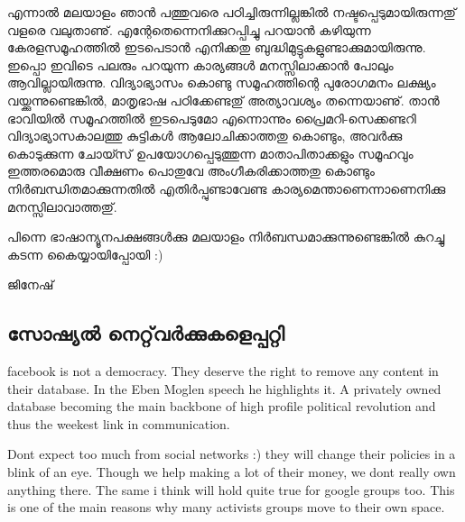 എന്നാല്‍ മലയാളം ഞാന്‍ പത്തുവരെ പഠിച്ചിരുന്നില്ലങ്കില്‍
നഷ്ടപ്പെടുമായിരുന്നതു് വളരെ വലുതാണു്. എന്റേതെന്നെനിക്കുറപ്പിച്ചു
പറയാന്‍ കഴിയുന്ന കേരളസമൂഹത്തില്‍ ഇടപെടാന്‍ എനിക്കതു
ബുദ്ധിമുട്ടുകളുണ്ടാക്കുമായിരുന്നു. ഇപ്പൊ ഇവിടെ പലരും പറയുന്ന
കാര്യങ്ങള്‍ മനസ്സിലാക്കാന്‍ പോലും ആവില്ലായിരുന്നു. വിദ്യാഭ്യാസം കൊണ്ടു
സമൂഹത്തിന്റെ പുരോഗമനം ലക്ഷ്യം വയ്ക്കുന്നുണ്ടെങ്കില്‍, മാതൃഭാഷ
പഠിക്കേണ്ടതു് അത്യാവശ്യം തന്നെയാണു്. താന്‍ ഭാവിയില്‍ സമൂഹത്തില്‍
ഇടപെടുമോ എന്നൊന്നും പ്രൈമറി-സെക്കണ്ടറി വിദ്യാഭ്യാസകാലത്തു കുട്ടികള്‍
ആലോചിക്കാത്തതു കൊണ്ടും, അവര്‍ക്കു കൊടുക്കുന്ന ചോയ്സ്
ഉപയോഗപ്പെടുത്തുന്ന മാതാപിതാക്കളും സമൂഹവും ഇത്തരമൊരു വീക്ഷണം പൊതുവേ
അംഗീകരിക്കാത്തതു കൊണ്ടും നിര്‍ബന്ധിതമാക്കുന്നതില്‍ എതിര്‍പ്പുണ്ടാവേണ്ട
കാര്യമെന്താണെന്നാണെനിക്കു മനസ്സിലാവാത്തതു്.

പിന്നെ ഭാഷാന്യൂനപക്ഷങ്ങള്‍ക്കു മലയാളം നിര്‍ബന്ധമാക്കുന്നുണ്ടെങ്കില്‍
കുറച്ചു കടന്ന കൈയ്യായിപ്പോയി :)

ജിനേഷ്

\subsection*{സോഷ്യല്‍ നെറ്റ്‌‌വര്‍ക്കുകളെപ്പറ്റി}
\begin{english}

facebook is not a democracy. They deserve the right to remove any
content in their database. In the Eben Moglen speech he highlights it.
A privately owned database becoming the main backbone of high profile
political revolution and thus the weekest link in communication.

Dont expect too much from social networks :) they will change their
policies in a blink of an eye. Though we help making a lot of their
money, we dont really own anything there. The same i think will hold
quite true for google groups too. This is one of the main reasons why
many activists groups move to their own space.

\end{english}

